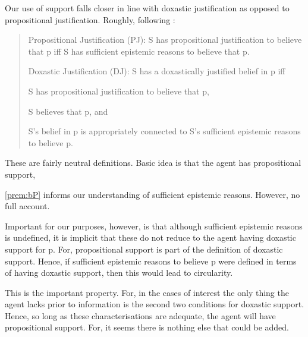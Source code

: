 \begin{note}
    Our use of support falls closer in line with doxastic justification as opposed to propositional justification.
  Roughly, following \textcite{Silva:2020aa}:

  \begin{quote}
    Propositional Justification (PJ): S has propositional justification to believe that p iff S has sufficient epistemic reasons to believe that p.

    Doxastic Justification (DJ): S has a doxastically justified belief in p iff
    \begin{enumerate*}[label=(\roman*)]
    \item S has propositional justification to believe that p,
    \item S believes that p, and
    \item S's belief in p is appropriately connected to S's sufficient epistemic reasons to believe p.
    \end{enumerate*}
  \end{quote}

  These are fairly neutral definitions.
  Basic idea is that the agent has propositional support, 

  \ref{prem:bP} informs our understanding of sufficient epistemic reasons.
  However, no full account.
\end{note}

\begin{note}
  Important for our purposes, however, is that although sufficient epistemic reasons is undefined, it is implicit that these do not reduce to the agent having doxastic support for p.
  For, propositional support is part of the definition of doxastic support.
  Hence, if sufficient epistemic reasons to believe p were defined in terms of having doxastic support, then this would lead to circularity.

  This is the important property.
  For, in the cases of interest the only thing the agent lacks prior to information is the second two conditions for doxastic support.
  Hence, so long as these characterisations are adequate, the agent will have propositional support.
  For, it seems there is nothing else that could be added.
\end{note}

